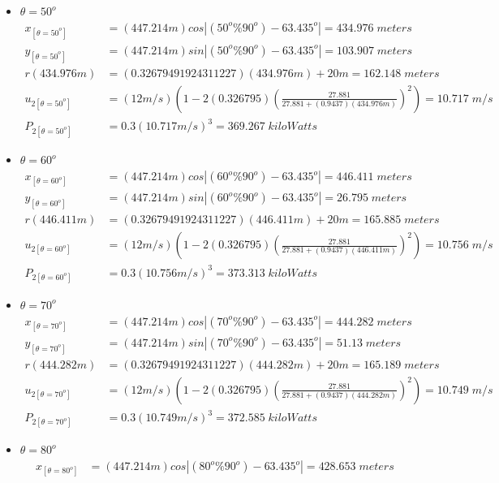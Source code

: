 \begin{itemize}
\item $\theta=50^o$
	\begin{align*}%
		x_{[\theta=50^o]} &=(447.214m) cos\left| (50^o\%90^o) - 63.435^o \right|  =434.976\;meters \\
		y_{[\theta=50^o]} &=(447.214m) sin\left| (50^o\%90^o) - 63.435^o \right|  =103.907\;meters \\
		r(434.976m) &=(0.32679491924311227)(434.976m)+20m  =162.148\;meters\\
		u_{2[\theta=50^o]} &=(12m/s)\left( 1-2(0.326795)\left( \frac{27.881}{27.881+(0.9437)(434.976m)} \right)^2 \right) =10.717\;m/s \\
		P_{2[\theta=50^o]} &=0.3(10.717m/s)^3  =369.267\;kiloWatts
\end{align*}
\item $\theta=60^o$
	\begin{align*}%
		x_{[\theta=60^o]} &=(447.214m) cos\left| (60^o\%90^o) - 63.435^o \right|  =446.411\;meters \\
		y_{[\theta=60^o]} &=(447.214m) sin\left| (60^o\%90^o) - 63.435^o \right|  =26.795\;meters \\
		r(446.411m) &=(0.32679491924311227)(446.411m)+20m  =165.885\;meters\\
		u_{2[\theta=60^o]} &=(12m/s)\left( 1-2(0.326795)\left( \frac{27.881}{27.881+(0.9437)(446.411m)} \right)^2 \right) =10.756\;m/s \\
		P_{2[\theta=60^o]} &=0.3(10.756m/s)^3  =373.313\;kiloWatts
\end{align*}
\item $\theta=70^o$
	\begin{align*}%
		x_{[\theta=70^o]} &=(447.214m) cos\left| (70^o\%90^o) - 63.435^o \right|  =444.282\;meters \\
		y_{[\theta=70^o]} &=(447.214m) sin\left| (70^o\%90^o) - 63.435^o \right|  =51.13\;meters \\
		r(444.282m) &=(0.32679491924311227)(444.282m)+20m  =165.189\;meters\\
		u_{2[\theta=70^o]} &=(12m/s)\left( 1-2(0.326795)\left( \frac{27.881}{27.881+(0.9437)(444.282m)} \right)^2 \right) =10.749\;m/s \\
		P_{2[\theta=70^o]} &=0.3(10.749m/s)^3  =372.585\;kiloWatts
\end{align*}
\item $\theta=80^o$
	\begin{align*}%
		x_{[\theta=80^o]} &=(447.214m) cos\left| (80^o\%90^o) - 63.435^o \right|  =428.653\;meters \\

\end{align*}
\end{itemize}
